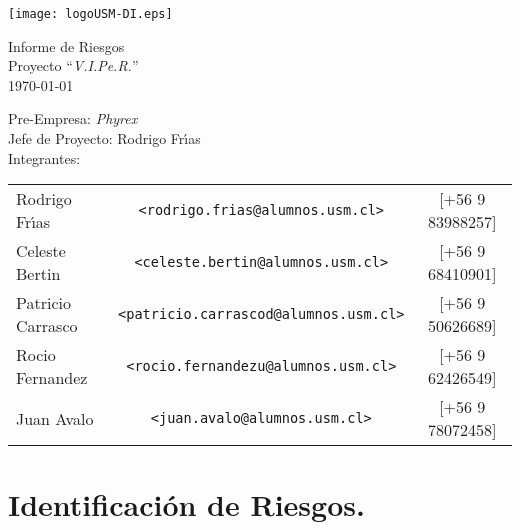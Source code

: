 \documentclass[letterpaper,12pt]{article} %
\numberwithin{equation}{section} %
\numberwithin{figure}{section} %
\numberwithin{table}{section} %
\begin{document}
\begin{titlepage} %
\thispagestyle{empty} %
\begin{center}
\texttt{[image: logoUSM-DI.eps]}
\end{center}

\vspace{3cm} %
\begin{center} %
  { 
    \Huge Informe de Riesgos\\
    \huge Proyecto ``\emph{V.I.Pe.R.}''\\
    \normalsize\today
  }
\end{center}

\vspace{6cm}

\vfill
\begin{flushleft} %
Pre-Empresa: \emph{Phyrex}\\
Jefe de Proyecto: Rodrigo Fr\'{\i}as\\
Integrantes:
\begin{table}[hb]
  \begin{tabular}{lcc}
    Rodrigo Fr\'{\i}as & \texttt{\small <rodrigo.frias@alumnos.usm.cl>} & [+56 9 83988257] \\
    Celeste Bertin & \texttt{\small <celeste.bertin@alumnos.usm.cl>} &[+56 9 68410901]\\
    Patricio Carrasco &\texttt{\small <patricio.carrascod@alumnos.usm.cl>} &[+56 9 50626689]\\
    Rocio Fernandez &\texttt{\small <rocio.fernandezu@alumnos.usm.cl>} & [+56 9 62426549]\\
    Juan Avalo & \texttt{\small <juan.avalo@alumnos.usm.cl>} & [+56 9 78072458]\\
  \end{tabular}
\end{table}
\end{flushleft}
\end{titlepage}


\setcounter{page}{1} %

\tableofcontents

\newpage
\section{Identificaci\'on de Riesgos.} 
\end{document}
